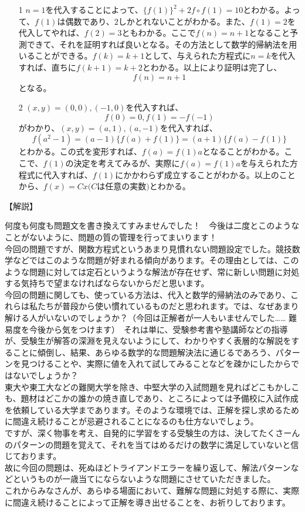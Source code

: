 \documentclass[a4paper,fleqn,dvipdfmx]{jsarticle}
\begin{document}
\begin{itemize}
    \item [1] 
    $n=1$を代入することによって、$\{f(1)\}^2+2f\circ f(1)=10$とわかる。よって、$f(1)$は偶数であり、$2$しかとれないことがわかる。また、$f(1)=2$を代入してやれば、$f(2)=3$ともわかる。ここで$f(n)=n+1$となること予測できて、それを証明すれば良いとなる。その方法として数学的帰納法を用いることができる。$f(k)=k+1$として、与えられた方程式に$n=k$を代入すれば、直ちに$f(k+1)=k+2$とわかる。以上により証明は完了し、$$f(n)=n+1$$となる。
    
    \item [2]
    $(x,y)=(0,0),(-1,0)$を代入すれば、
    $$f(0)=0,f(1)=-f(-1)$$
    がわかり、$(x,y)=(a,1),(a,-1)$を代入すれば、
    $$f(a^2-1)=(a-1)\{f(a)+f(1)\}=(a+1)\{f(a)-f(1)\}$$
    とわかる。この式を変形すれば、$f(a)=f(1)a$となることがわかる。ここで、$f(1)$の決定を考えてみるが、実際に$f(a)=f(1)a$を与えられた方程式に代入すれば、$f(1)$にかかわらず成立することがわかる。以上のことから、$f(x)=Cx(C$は任意の実数$)$とわかる。
    
\end{itemize}


\begin{flushleft}
【解説】
\end{flushleft}

何度も何度も問題文を書き換えてすみませんでした！　今後は二度とこのようなことがないように、問題の質の管理を行ってまいります！\\
今回の問題ですが、関数方程式というあまり見慣れない問題設定でした。競技数学などではこのような問題が好まれる傾向があります。その理由としては、このような問題に対しては定石というような解法が存在せず、常に新しい問題に対処する気持ちで望まなければならないからだと思います。\\
今回の問題に関しても、使っている方法は、代入と数学的帰納法のみであり、これらは私たちが普段から使い慣れているものだと思われます。では、なぜあまり解ける人がいないのでしょうか？（今回は正解者が一人もいませんでした…… 難易度を今後から気をつけます）　それは単に、受験参考書や塾講師などの指導が、受験生が解答の深淵を見えないようにして、わかりやすく表層的な解説をすることに傾倒し、結果、あらゆる数学的な問題解決法に通じるであろう、パターンを見つけることや、実際に値を入れて試してみることなどを疎かにしたからではないでしょうか？\\
東大や東工大などの難関大学を除き、中堅大学の入試問題を見ればどこもかしこも、題材はどこかの誰かの焼き直しであり、ところによっては予備校に入試作成を依頼している大学まであります。そのような環境では、正解を探し求めるために間違え続けることが忌避されることになるのも仕方ないでしょう。\\
ですが、深く物事を考え、自発的に学習をする受験生の方は、決してたくさーんのパターンの問題を覚えて、それを当てはめるだけの数学に満足していないと信じております。\\
故に今回の問題は、死ぬほどトライアンドエラーを繰り返して、解法パターンなどというものが一歳当てにならないような問題にさせていただきました。\\
これからみなさんが、あらゆる場面において、難解な問題に対処する際に、実際に間違え続けることによって正解を導き出せることを、お祈りしております。
\end{document}
